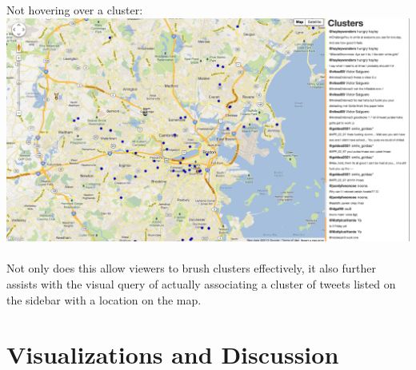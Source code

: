 \documentclass[pdftex,12pt,a4paper]{article}
\begin{document}
Not hovering over a cluster: \\ 
\includegraphics[width=5.5in]{hover2.png} \\ \\
Not only does this allow viewers to brush clusters effectively, it also further assists with the visual query of actually associating a cluster of tweets listed on the sidebar with a location on the map.

\section{Visualizations and Discussion} 
\end{document}
